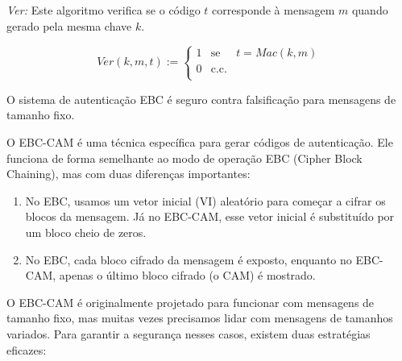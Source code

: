 {\em Ver:} Este algoritmo verifica se o código $t$ corresponde à mensagem $m$ quando gerado pela mesma chave $k$.

\begin{displaymath}
  Ver(k, m, t) :=  \left\{
  \begin{array}{lcl}
    1 & \textrm{se} & t = Mac(k,m)\\
    0 & \textrm{c.c.} &\\
  \end{array}
  \right.
\end{displaymath}


\begin{center}
\end{center}


\begin{theorem}
  O sistema de autenticação EBC é seguro contra falsificação para mensagens de tamanho fixo.
\end{theorem}

O EBC-CAM é uma técnica específica para gerar códigos de autenticação.
Ele funciona de forma semelhante ao modo de operação EBC (Cipher Block Chaining), mas com duas diferenças importantes:

\begin{enumerate}
\item No EBC, usamos um vetor inicial (VI) aleatório para começar a cifrar os blocos da mensagem.
  Já no EBC-CAM, esse vetor inicial é substituído por um bloco cheio de zeros.
\item No EBC, cada bloco cifrado da mensagem é exposto, enquanto no EBC-CAM, apenas o último bloco cifrado (o CAM) é mostrado.
\end{enumerate}

O EBC-CAM é originalmente projetado para funcionar com mensagens de tamanho fixo, mas muitas vezes precisamos lidar com mensagens de tamanhos variados.
Para garantir a segurança nesses casos, existem duas estratégias eficazes:

